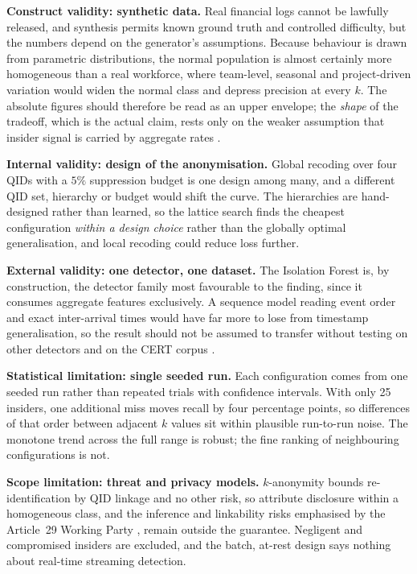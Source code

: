 \documentclass[10pt,a4paper]{article}
\begin{document}
\noindent\textbf{Construct validity: synthetic data.} Real financial logs cannot be lawfully released, and synthesis permits known ground truth and controlled difficulty, but the numbers depend on the generator's assumptions. Because behaviour is drawn from parametric distributions, the normal population is almost certainly more homogeneous than a real workforce, where team-level, seasonal and project-driven variation would widen the normal class and depress precision at every $k$. The absolute figures should therefore be read as an upper envelope; the \emph{shape} of the tradeoff, which is the actual claim, rests only on the weaker assumption that insider signal is carried by aggregate rates \cite{homoliak2019,glasser2013}.

\noindent\textbf{Internal validity: design of the anonymisation.} Global recoding over four QIDs with a $5\%$ suppression budget is one design among many, and a different QID set, hierarchy or budget would shift the curve. The hierarchies are hand-designed rather than learned, so the lattice search finds the cheapest configuration \emph{within a design choice} rather than the globally optimal generalisation, and local recoding \cite{xu2006} could reduce loss further.

\noindent\textbf{External validity: one detector, one dataset.} The Isolation Forest is, by construction, the detector family most favourable to the finding, since it consumes aggregate features exclusively. A sequence model reading event order and exact inter-arrival times would have far more to lose from timestamp generalisation, so the result should not be assumed to transfer without testing on other detectors and on the CERT corpus \cite{glasser2013}.

\noindent\textbf{Statistical limitation: single seeded run.} Each configuration comes from one seeded run rather than repeated trials with confidence intervals. With only 25 insiders, one additional miss moves recall by four percentage points, so differences of that order between adjacent $k$ values sit within plausible run-to-run noise. The monotone trend across the full range is robust; the fine ranking of neighbouring configurations is not.

\noindent\textbf{Scope limitation: threat and privacy models.} $k$-anonymity bounds re-identification by QID linkage and no other risk, so attribute disclosure within a homogeneous class, and the inference and linkability risks emphasised by the Article~29 Working Party \cite{wp29anon2014}, remain outside the guarantee. Negligent and compromised insiders are excluded, and the batch, at-rest design says nothing about real-time streaming detection.
\end{document}
